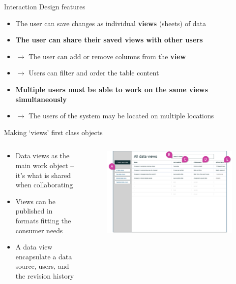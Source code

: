\documentclass[aspectratio=169]{beamer}
\begin{document}
\begin{frame}{Interaction Design features}
    \begin{itemize}
        \item The user can save changes as individual \textbf{views} (sheets) of data
        \item \textbf{The user can share their saved views with other users}
        \item[] $\rightarrow$ The user can add or remove columns from the \textbf{view}
        \item[] $\rightarrow$ Users can filter and order the table content
        \item \textbf{Multiple users must be able to work on the same views simultaneously}
        \item[] $\rightarrow$ The users of the system may be located on multiple locations
    \end{itemize} 
\end{frame}


\begin{frame}{Making `views' first class objects}
    \begin{columns}
        \begin{column}{0.4\textwidth}
            \begin{itemize}
                \footnotesize
                \item Data views as the main work object -- it's what is shared when collaborating
                \item Views can be published in formats fitting the consumer needs
                \item A data view encapsulate a data source, users, and the revision history
            \end{itemize}
        \end{column}
        \begin{column}{0.6\textwidth}
            \begin{figure}[h]
                \centering
                \includegraphics[width=1\textwidth]{images/all-views-with-marks.png}
            \end{figure}
        \end{column}
    \end{columns}
\end{frame}
\end{document}
